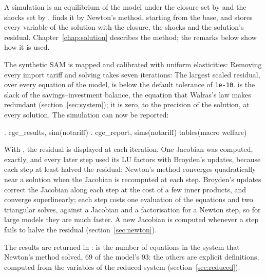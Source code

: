 
A simulation is an equilibrium of the model under the closure set by
 and the shocks set by . 
finds it by Newton's method, starting from the base, and stores every variable
of the solution with the closure, the shocks and the solution's residual.
Chapter~\ref{chap:solution} describes the method; the remarks below show how
it is used.


The synthetic SAM is mapped and calibrated with uniform elasticities:
Removing every import tariff and solving takes seven iterations:
The largest scaled residual, over every equation of the model, is below the
default tolerance of \texttt{1e-10}.  is the slack of the
savings--investment balance, the equation that Walras's law makes redundant
(section~\ref{sec:system}); it is zero, to the precision of the solution, at
every solution. The simulation can now be reported:
\begin{stcode}
. cge_results, sim(notariff)
. cge_report, sims(notariff) tables(macro welfare)
\end{stcode}


With , the residual is displayed at each iteration. One Jacobian
was computed, exactly, and every later step used its LU factors with
Broyden's updates, because each step at least halved the residual:
Newton's method converges quadratically near a solution when the Jacobian is
recomputed at each step. Broyden's updates correct the Jacobian along each
step at the cost of a few inner products, and converge superlinearly; each
step costs one evaluation of the equations and two triangular solves, against
a Jacobian and a factorisation for a Newton step, so for large models they
are much faster. A new Jacobian is computed whenever a step fails to halve
the residual (section~\ref{sec:newton}).

The results are returned in :
 is the number of equations in the system that Newton's
method solved, 69 of the model's 93: the others are explicit definitions,
computed from the variables of the reduced system (section~\ref{sec:reduced}).


